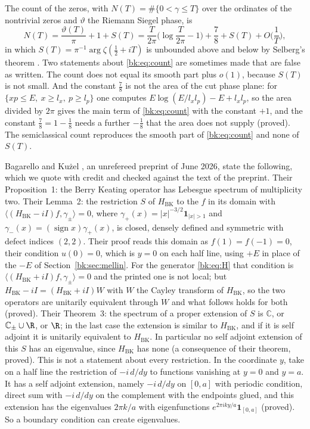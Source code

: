 The count of the zeros, with $N(T)=\#\{0<\gamma\le T\}$ over the ordinates of the nontrivial zeros and $\vartheta$ the Riemann Siegel phase, is
\begin{equation}\label{bk:eq:count}
N(T)=\frac{\vartheta(T)}\pi+1+S(T)=\frac T{2\pi}\Big(\log\frac T{2\pi}-1\Big)+\frac78+S(T)+O\Big(\frac1T\Big),
\end{equation}
in which $S(T)=\pi^{-1}\arg\zeta(\frac12+iT)$ is unbounded above and below by Selberg's theorem \cite{Selberg46}. Two statements about \eqref{bk:eq:count} are sometimes made that are false as written. The count does not equal its smooth part plus $o(1)$, because $S(T)$ is not small. And the constant $\frac78$ is not the area of the cut phase plane: for $\{xp\le E,\ x\ge l_x,\ p\ge l_p\}$ one computes $E\log(E/l_xl_p)-E+l_xl_p$, so the area divided by $2\pi$ gives the main term of \eqref{bk:eq:count} with the constant $+1$, and the constant $\frac78=1-\frac18$ needs a further $-\frac18$ that the area does not supply (proved). The semiclassical count reproduces the smooth part of \eqref{bk:eq:count} and none of $S(T)$.

Bagarello and Ku\.{z}el \cite{BagarelloKuzel26}, an unrefereed preprint of June 2026, state the following, which we quote with credit and checked against the text of the preprint. Their Proposition~1: the Berry Keating operator has Lebesgue spectrum of multiplicity two. Their Lemma~2: the restriction $S$ of $H_{\mathrm{BK}}$ to the $f$ in its domain with $\langle(H_{\mathrm{BK}}-iI)f,\gamma_\pm\rangle=0$, where $\gamma_+(x)=|x|^{-3/2}\mathbf 1_{|x|>1}$ and $\gamma_-(x)=(\operatorname{sign}x)\gamma_+(x)$, is closed, densely defined and symmetric with defect indices $(2,2)$. Their proof reads this domain as $f(1)=f(-1)=0$, their condition $u(0)=0$, which is $y=0$ on each half line, using $+E$ in place of the $-E$ of Section~\ref{bk:sec:mellin}. For the generator \eqref{bk:eq:H} that condition is $\langle(H_{\mathrm{BK}}+iI)f,\gamma_\pm\rangle=0$ and the printed one is not local; but $H_{\mathrm{BK}}-iI=(H_{\mathrm{BK}}+iI)W$ with $W$ the Cayley transform of $H_{\mathrm{BK}}$, so the two operators are unitarily equivalent through $W$ and what follows holds for both (proved). Their Theorem~3: the spectrum of a proper extension of $S$ is $\mathbb C$, or $\mathbb C_\pm\cup\R$, or $\R$; in the last case the extension is similar to $H_{\mathrm{BK}}$, and if it is self adjoint it is unitarily equivalent to $H_{\mathrm{BK}}$. In particular no self adjoint extension of this $S$ has an eigenvalue, since $H_{\mathrm{BK}}$ has none (a consequence of their theorem, proved). This is not a statement about every restriction. In the coordinate $y$, take on a half line the restriction of $-i\,d/dy$ to functions vanishing at $y=0$ and $y=a$. It has a self adjoint extension, namely $-i\,d/dy$ on $[0,a]$ with periodic condition, direct sum with $-i\,d/dy$ on the complement with the endpoints glued, and this extension has the eigenvalues $2\pi k/a$ with eigenfunctions $e^{2\pi iky/a}\mathbf 1_{[0,a]}$ (proved). So a boundary condition can create eigenvalues.

